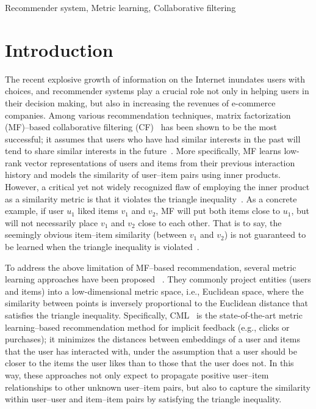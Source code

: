 \documentclass[conference]{IEEEtran}
\begin{document}
\begin{IEEEkeywords}
Recommender system, Metric learning, Collaborative filtering
\end{IEEEkeywords}

\section{Introduction}


The recent explosive growth of information on the Internet inundates users with choices, and recommender systems play a crucial role not only in helping users in their decision making, but also in increasing the revenues of e-commerce companies.
Among various recommendation techniques, matrix factorization (MF)--based collaborative filtering (CF)~\cite{koren2008factorization} has been shown to be the most successful; it assumes that users who have had similar interests in the past will tend to share similar interests in the future~\cite{bobadilla2013recommender}. More specifically, MF learns low-rank vector representations of users and items from their previous interaction history and models the similarity of user--item pairs using inner products. However, a critical yet not widely recognized flaw of employing the inner product as a similarity metric is that it violates the triangle inequality~\cite{ram2012maximum}. As a concrete example, if user $u_1$ liked items $v_1$ and $v_2$, MF will put both items close to $u_1$, but will not necessarily place $v_1$ and $v_2$ close to each other. That is to say, the seemingly obvious item--item similarity (between $v_1$ and $v_2$) is not guaranteed to be learned when the triangle inequality is violated~\cite{hsieh2017collaborative}.


To address the above limitation of MF--based recommendation, several metric learning approaches have been proposed
~\cite{khoshneshin2010collaborative,chen2012playlist,feng2015personalized,hsieh2017collaborative}.
They commonly project entities (users and items) into a low-dimensional metric space, i.e., Euclidean space, where the similarity between points is inversely proportional to the Euclidean distance that satisfies the triangle inequality.
Specifically, CML~\cite{hsieh2017collaborative} is the state-of-the-art 
metric learning--based recommendation method for implicit feedback (e.g., clicks or purchases);
it minimizes the distances between embeddings of a user and items that the user has interacted with, under the assumption that a user should be closer to the items the user likes than to those that the user does not.
In this way, these approaches not only expect to propagate positive user--item relationships to other unknown user--item pairs, but also to capture the similarity within user--user and item--item pairs by satisfying the triangle inequality.
\end{document}
